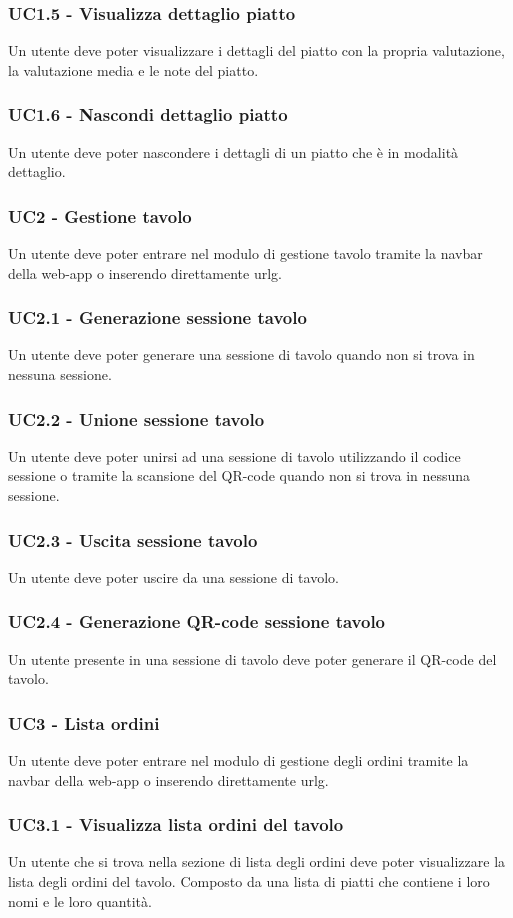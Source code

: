 \subsubsection{UC1.5 - Visualizza dettaglio piatto}
Un utente deve poter visualizzare i dettagli del piatto con la propria valutazione, la valutazione media e le note del piatto.
\subsubsection{UC1.6 - Nascondi dettaglio piatto}
Un utente deve poter nascondere i dettagli di un piatto che è in modalità dettaglio.
\subsubsection{UC2 - Gestione tavolo}
Un utente deve poter entrare nel modulo di gestione tavolo tramite la navbar della web-app o inserendo direttamente \gls{urlg}.
\subsubsection{UC2.1 - Generazione sessione tavolo}
Un utente deve poter generare una sessione di tavolo quando non si trova in nessuna sessione.
\subsubsection{UC2.2 - Unione sessione tavolo}
Un utente deve poter unirsi ad una sessione di tavolo utilizzando il codice sessione o tramite la scansione del QR-code quando non si trova in nessuna sessione.
\subsubsection{UC2.3 - Uscita sessione tavolo}
Un utente deve poter uscire da una sessione di tavolo.
\subsubsection{UC2.4 - Generazione QR-code sessione tavolo}
Un utente presente in una sessione di tavolo deve poter generare il QR-code del tavolo.
\subsubsection{UC3 - Lista ordini}
Un utente deve poter entrare nel modulo di gestione degli ordini tramite la navbar della web-app o inserendo direttamente \gls{urlg}.
\subsubsection{UC3.1 - Visualizza lista ordini del tavolo}
Un utente che si trova nella sezione di lista degli ordini deve poter visualizzare la lista degli ordini del tavolo. Composto da una lista di piatti che contiene i loro nomi e le loro quantità.

